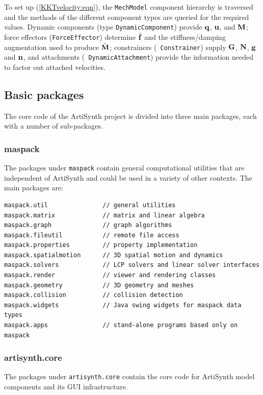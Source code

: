To set up (\ref{KKTvelocity:eqn}), the {\tt MechModel} component
hierarchy is traversed and the methods of the different component
types are queried for the required values.  Dynamic components (type
{\tt DynamicComponent}) provide ${\bf q}$, ${\bf u}$, and ${\bf M}$; force effectors
({\tt ForceEffector}) determine $\hat{{\bf f}}$ and the stiffness/damping
augmentation used to produce $\hat{{\bf M}}$; constrainers ({\tt
Constrainer}) supply ${\bf G}$, ${\bf N}$, ${\bf g}$ and ${\bf n}$, and attachments ({\tt
DynamicAttachment}) provide the information needed to factor out
attached velocities.

\subsection{Basic packages}

The core code of the ArtiSynth project is divided into three main
packages, each with a number of sub-packages.

\subsubsection{maspack}

The packages under {\tt maspack} contain general computational
utilities that are independent of ArtiSynth and could be
used in a variety of other contexts. The main packages are:

\begin{lstlisting}[]
maspack.util               // general utilities
maspack.matrix             // matrix and linear algebra
maspack.graph              // graph algorithms
maspack.fileutil           // remote file access 
maspack.properties         // property implementation
maspack.spatialmotion      // 3D spatial motion and dynamics
maspack.solvers            // LCP solvers and linear solver interfaces
maspack.render             // viewer and rendering classes
maspack.geometry           // 3D geometry and meshes
maspack.collision          // collision detection
maspack.widgets            // Java swing widgets for maspack data types 
maspack.apps               // stand-alone programs based only on maspack
\end{lstlisting}

\subsubsection{artisynth.core}

The packages under {\tt artisynth.core} contain the core code for
ArtiSynth model components and its GUI infrastructure.

